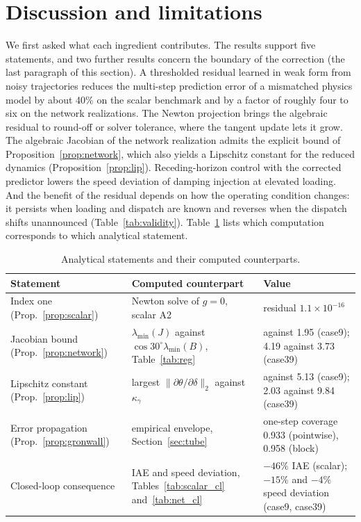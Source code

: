 \documentclass[preprint,12pt]{elsarticle}
\newcommand{\chainA}{1.73}
\newcommand{\chainB}{2.03}
\newcommand{\chainC}{5.13}
\newcommand{\chainD}{9.84}
\begin{document}
\section{Discussion and limitations}
\label{sec:limits}
We first asked what each ingredient contributes. The results support five statements, and two further results concern the boundary of the correction (the last paragraph of this section). A thresholded residual learned in weak form from noisy trajectories reduces the multi-step prediction error of a mismatched physics model by about 40\% on the scalar benchmark and by a factor of roughly four to six on the network realizations. The Newton projection brings the algebraic residual to round-off or solver tolerance, where the tangent update lets it grow. The algebraic Jacobian of the network realization admits the explicit bound of Proposition~\ref{prop:network}, which also yields a Lipschitz constant for the reduced dynamics (Proposition~\ref{prop:lip}). Receding-horizon control with the corrected predictor lowers the speed deviation of damping injection at elevated loading. And the benefit of the residual depends on how the operating condition changes: it persists when loading and dispatch are known and reverses when the dispatch shifts unannounced (Table~\ref{tab:validity}). Table~\ref{tab:map} lists which computation corresponds to which analytical statement.

\begin{table}[!t]\centering\small
\caption{Analytical statements and their computed counterparts.}
\label{tab:map}
\begin{tabular}{>{\raggedright\arraybackslash}p{3.5cm}>{\raggedright\arraybackslash}p{4.5cm}>{\raggedright\arraybackslash}p{4.3cm}}
\toprule
Statement & Computed counterpart & Value \\
\midrule
Index one (Prop.~\ref{prop:scalar}) & Newton solve of $g=0$, scalar A2 & residual $1.1\times10^{-16}$ \\
Jacobian bound (Prop.~\ref{prop:network}) & $\lambda_{\min}(J)$ against $\cos30^\circ\lambda_{\min}(B)$, Table~\ref{tab:reg} & 2.24 against 1.95 (case9); 4.19 against 3.73 (case39) \\
Lipschitz constant (Prop.~\ref{prop:lip}) & largest $\|\partial\theta/\partial\delta\|_2$ against $\kappa_\gamma$ & \chainA{} against \chainC{} (case9); \chainB{} against \chainD{} (case39) \\
Error propagation (Prop.~\ref{prop:gronwall}) & empirical envelope, Section~\ref{sec:tube} & one-step coverage 0.933 (pointwise), 0.958 (block) \\
Closed-loop consequence & IAE and speed deviation, Tables~\ref{tab:scalar_cl} and~\ref{tab:net_cl} & $-46\%$ IAE (scalar); $-15\%$ and $-4\%$ speed deviation (case9, case39) \\
\bottomrule
\end{tabular}
\end{table}
\end{document}
